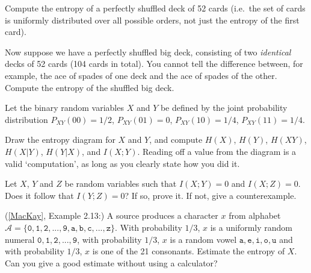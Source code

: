 \documentclass[a4paper,10pt,landscape,twocolumn]{scrartcl}
\begin{document}
\begin{exercise}
	\begin{subex}
	Compute the entropy of a perfectly shuffled deck of 52 cards
        (i.e.\ the set of cards is uniformly distributed over all
        possible orders, not just the entropy of the first card).
	\end{subex}
	
	\begin{subex}
	Now suppose we have a perfectly shuffled big deck, consisting of two \emph{identical} decks of 52 cards (104 cards in total). You cannot tell the difference between, for example, the ace of spades of one deck and the ace of spades of the other. Compute the entropy of the shuffled big deck.
	\end{subex}
\end{exercise}


\begin{exercise}
	
	\begin{subex}
		Let the binary random variables $X$ and $Y$ be defined by the joint probability distribution $P_{XY}(00) = 1/2$, $P_{XY}(01) = 0$, $P_{XY}(10) = 1/4$, $P_{XY}(11) = 1/4$.
		
		Draw the entropy diagram for $X$ and $Y$, and compute $H(X)$, $H(Y)$, $H(XY)$, $H(X|Y)$, $H(Y|X)$, and $I(X;Y)$. Reading off a value from the diagram is a valid `computation', as long as you clearly state how you did it.
		\begin{center}
		\end{center}
	\end{subex}
	
	\begin{subex}
Let $X$, $Y$ and $Z$ be random variables such that $I(X;Y) = 0$ and $I(X;Z) = 0$. Does it follow that $I(Y;Z) = 0$? If so, prove it. If not, give a counterexample.
\end{subex}
\end{exercise}

\begin{exercise}
(\href{http://www.inference.phy.cam.ac.uk/mackay/itila/book.html}{[MacKay]}, Example 2.13:) A source produces a character $x$ from alphabet $\mathcal{A} = \{\mathtt{0, 1, 2, ..., 9, a, b, c, ..., z}\}$. With probability $1/3$, $x$ is a uniformly random numeral $\mathtt{0,1,2,...,9}$, with probability $1/3$, $x$ is a random vowel $\mathtt{a,e,i,o,u}$ and with probability $1/3$, $x$ is one of the 21 consonants. Estimate the entropy of $X$. Can you give a good estimate without using a calculator?
\end{exercise}
\end{document}
